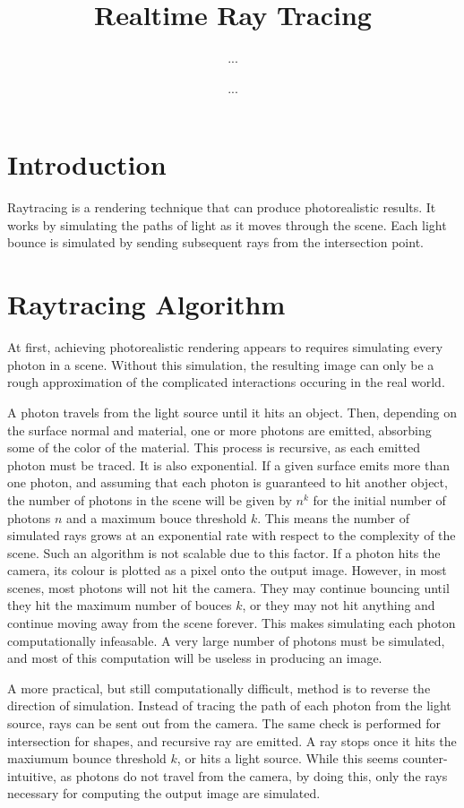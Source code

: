 \documentclass{article}
\title{Realtime Ray Tracing}
\author{...}
\date{...}
\begin{document}
\maketitle

\tableofcontents

\section{Introduction}

    Raytracing is a rendering technique that can produce photorealistic results. It works by
    simulating the paths of light as it moves through the scene. Each light bounce is simulated by
    sending subsequent rays from the intersection point.

\section{Raytracing Algorithm}

    At first, achieving photorealistic rendering appears to requires simulating every photon in a
    scene. Without this simulation, the resulting image can only be a rough approximation of the
    complicated interactions occuring in the real world.

    A photon travels from the light source until it hits an object. Then, depending on the surface
    normal and material, one or more photons are emitted, absorbing some of the color of the
    material. This process is recursive, as each emitted photon must be traced. It is also
    exponential. If a given surface emits more than one photon, and assuming that each photon is
    guaranteed to hit another object, the number of photons in the scene will be given by $n^k$ for
    the initial number of photons $n$ and a maximum bouce threshold $k$. This means the number of
    simulated rays grows at an exponential rate with respect to the complexity of the scene. Such
    an algorithm is not scalable due to this factor. If a photon hits the camera, its colour is
    plotted as a pixel onto the output image. However, in most scenes, most photons will not hit
    the camera. They may continue bouncing until they hit the maximum number of bouces $k$, or they
    may not hit anything and continue moving away from the scene forever. This makes simulating
    each photon computationally infeasable. A very large number of photons must be simulated, and
    most of this computation will be useless in producing an image.

    A more practical, but still computationally difficult, method is to reverse the direction of
    simulation. Instead of tracing the path of each photon from the light source, rays can be sent
    out from the camera. The same check is performed for intersection for shapes, and recursive
    ray are emitted. A ray stops once it hits the maxiumum bounce threshold $k$, or hits a light
    source. While this seems counter-intuitive, as photons do not travel from the camera, by doing
    this, only the rays necessary for computing the output image are simulated.
\end{document}
